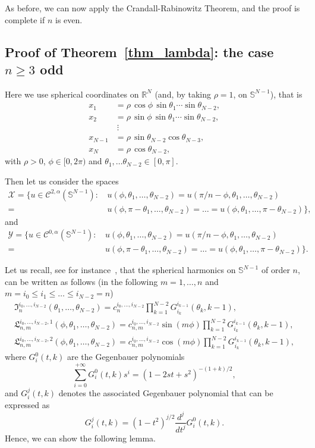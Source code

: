 \documentclass[10pt,reqno,english]{amsart}
\newcommand{\Sn}{\mathbb{S}^{N-1}}
\newcommand{\R} {\mathbb R}
\theoremstyle{definition}
\numberwithin{equation}{section}
\begin{document}
As before, we can now apply the Crandall-Rabinowitz Theorem, and the proof is complete if $n$ is even.



\subsection{Proof of Theorem\texorpdfstring{~\ref{thm_lambda}}{ 3}: the case \texorpdfstring{$n\ge3$}{n>=3} odd}
\label{devorichiamarla}


Here we use spherical coordinates on $\R^N$ (and, by taking $\rho=1$, on $\Sn$), that is
\[
\begin{aligned}
x_1 &=\rho\, \cos\phi \, \sin\theta_1 \cdots \sin\theta_{N-2}, \\
x_2 &=\rho\, \sin\phi \, \sin\theta_1 \cdots \sin\theta_{N-2}, \\
&\ \vdots \\
x_{N-1} &=\rho\, \sin\theta_{N-2} \cos\theta_{N-3}, \\
x_N &=\rho\, \cos\theta_{N-2},
\end{aligned}
\]
with $\rho>0$, $\phi \in [0,2\pi)$ and $\theta_1,\dots\theta_{N-2} \in [0,\pi]$.

Then let us consider the spaces
\begin{align*}
\mathcal X=\{u\in\mathcal C^{2,\alpha}(\Sn):\,&u(\phi,\theta_1,\dots,\theta_{N-2})=u(\pi/n-\phi,\theta_1,\dots,\theta_{N-2})\\
=&u(\phi,\pi-\theta_1,\dots,\theta_{N-2})=\dots=u(\phi,\theta_1,\dots,\pi-\theta_{N-2})\},
\end{align*}
and
\begin{align*}
\mathcal Y=\{u\in\mathcal C^{0,\alpha}(\Sn):\,&u(\phi,\theta_1,\dots,\theta_{N-2})=u(\pi/n-\phi,\theta_1,\dots,\theta_{N-2})\\
=&u(\phi,\pi-\theta_1,\dots,\theta_{N-2})=\dots=u(\phi,\theta_1,\dots,\pi-\theta_{N-2})\}.
\end{align*}

Let us recall, see for instance~\cite{Wnote}, that the spherical harmonics on $\Sn$ of order $n$, can be written as follows (in the following $m=1,\dots,n$ and $ m=i_0\le i_1\le\dots\le  i_{N-2}=n$)
\begin{gather*}
\mathfrak I_n^{i_0,\dots,i_{N-2}}(\theta_1,\dots,\theta_{N-2})=c_n^{i_0,\dots,i_{N-2}} \prod_{k=1}^{N-2}G^{i_{k-1}}_{i_k}(\theta_k,k-1),\\
\mathfrak L^{i_0,\dots,i_{N-2},1}_{n,m}(\phi,\theta_1,\dots,\theta_{N-2})=c_{n,m}^{i_0,\dots,i_{N-2}}\sin(m\phi)\prod_{k=1}^{N-2}G^{i_{k-1}}_{i_k}(\theta_k,k-1),\\
\mathfrak L^{i_0,\dots,i_{N-2},2}_{n,m}(\phi,\theta_1,\dots,\theta_{N-2})=c_{n,m}^{i_0,\dots,i_{N-2}}\cos(m\phi)\prod_{k=1}^{N-2}G^{i_{k-1}}_{i_k}(\theta_k,k-1),
\end{gather*}
where $G_i^0(t,k)$ are the Gegenbauer polynomials
\[
\sum_{i=0}^{+\infty}G_i^0(t,k)s^i=(1-2st+s^2)^{-(1+k)/2},
\]
and $G_i^j(t,k)$ denotes the associated Gegenbauer polynomial that can be expressed as
\[
G_i^j(t,k)=(1-t^2)^{j/2}\frac{d^j}{dt^j}G_i^0(t,k).
\]
Hence, we can show the following lemma.
\end{document}

